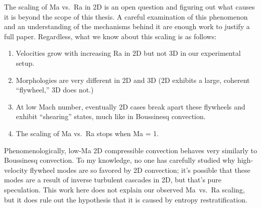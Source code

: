 The scaling of Ma vs.~Ra in 2D is an open question and figuring out what causes it is beyond the scope of this thesis.
A careful examination of this phenomenon and an understanding of the mechanisms behind it are enough work to justify a full paper.
Regardless, what we know about this scaling is as follows:
\begin{enumerate}
\item Velocities grow with increasing Ra in 2D but not 3D in our experimental setup.
\item Morphologies are very different in 2D and 3D (2D exhibits a large, coherent ``flywheel,'' 3D does not.)
\item At low Mach number, eventually 2D cases break apart these flywheels and exhibit ``shearing'' states, much like in Boussinesq convection.
\item The scaling of Ma vs.~Ra stops when Ma = 1.
\end{enumerate}
Phenomenologically, low-Ma 2D compressible convection behaves very similarly to Boussinesq convection.
To my knowledge, no one has carefully studied why high-velocity flywheel modes are so favored by 2D convection; it's possible that these modes are a result of inverse turbulent cascades in 2D, but that's pure speculation.
This work here does not explain our observed Ma~vs.~Ra scaling, but it does rule out the hypothesis that it is caused by entropy restratification.


